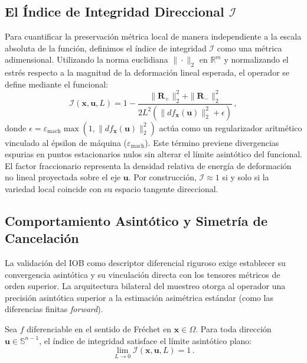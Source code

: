 \documentclass[11pt]{article}
\begin{document}
\subsection{El Índice de Integridad Direccional $\mathcal{I}$}

Para cuantificar la preservación métrica local de manera independiente a la escala absoluta de la función, definimos el índice de integridad $\mathcal{I}$ como una métrica adimensional. Utilizando la norma euclidiana $\|\cdot\|_2$ en $\mathbb{R}^m$ y normalizando el estrés respecto a la magnitud de la deformación lineal esperada, el operador se define mediante el funcional:
\begin{equation}
    \label{eq:indice_integridad}
    \mathcal{I}(\mathbf{x}, \mathbf{u}, L) = 1 - \frac{\|\mathbf{R}_+\|_2^2 + \|\mathbf{R}_-\|_2^2}{2L^2 (\|df_{\mathbf{x}}(\mathbf{u})\|_2^2 + \epsilon)} \,,
\end{equation}
donde $\epsilon = \varepsilon_{\text{mach}} \max(1, \|df_{\mathbf{x}}(\mathbf{u})\|_2^2)$ actúa como un regularizador aritmético vinculado al épsilon de máquina ($\varepsilon_{\text{mach}}$). Este término previene divergencias espurias en puntos estacionarios nulos sin alterar el límite asintótico del funcional. El factor fraccionario representa la densidad relativa de energía de deformación no lineal proyectada sobre el eje $\mathbf{u}$. Por construcción, $\mathcal{I} \approx 1$ si y solo si la variedad local coincide con su espacio tangente direccional.

\subsection{Comportamiento Asintótico y Simetría de Cancelación}

La validación del IOB como descriptor diferencial riguroso exige establecer su convergencia asintótica y su vinculación directa con los tensores métricos de orden superior. La arquitectura bilateral del muestreo otorga al operador una precisión asintótica superior a la estimación asimétrica estándar (como las diferencias finitas \textit{forward}).

\begin{lemma}
Sea $f$ diferenciable en el sentido de Fréchet en $\mathbf{x} \in \Omega$. Para toda dirección $\mathbf{u} \in \mathbb{S}^{n-1}$, el índice de integridad satisface el límite asintótico plano:
\begin{equation}
    \lim_{L \to 0} \mathcal{I}(\mathbf{x}, \mathbf{u}, L) = 1 \,.
\end{equation}
\end{lemma}
\end{document}
